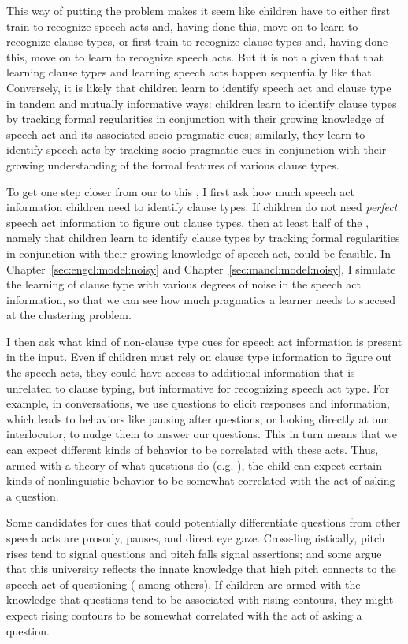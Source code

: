 This way of putting the problem makes it seem like children have to either first train to recognize speech acts and, having done this, move on to learn to recognize clause types, or first train to recognize clause types and, having done this, move on to learn to recognize speech acts. But it is not a given that 
that learning clause types and learning speech acts happen sequentially like that. Conversely, it is likely that children learn to identify speech act and clause type in tandem and mutually informative ways: children learn to identify clause types by tracking formal regularities in conjunction with their growing
knowledge of speech act and its associated socio-pragmatic cues; similarly, they learn
to identify speech acts by tracking socio-pragmatic cues in conjunction with their growing
understanding of the formal features of various clause types.


To get one step closer from our \subhypos{} to this \tbf{\hypos{}}, I first ask how much speech act information children need to identify clause types. If children do not need \emph{perfect} speech act information to figure out clause types, then at least half of the \hypos{}, namely that children learn to identify clause types by tracking formal regularities in conjunction with their growing
knowledge of speech act, could be feasible. 
In Chapter~\ref{sec:engcl:model:noisy} and Chapter~\ref{sec:mancl:model:noisy}, I simulate the learning of clause type with various degrees of noise in the speech act information, so that we can see how much pragmatics a learner needs to succeed at the clustering problem. 

I then %
ask what kind of non-clause type cues for speech act information is present in the input. Even if children must rely on clause type information to figure out the speech acts, they could have access to additional information that is unrelated to clause typing, but informative for recognizing speech act type. For example, in conversations, we use questions to elicit responses and information, which leads to behaviors like pausing after questions, or looking directly at our interlocutor, to nudge them to answer our questions. 
This in turn means that we can expect different kinds of behavior to be correlated with these acts. Thus, armed with a theory of what questions do (e.g. \cite{carruthers2018q}), the child can expect certain kinds of nonlinguistic behavior to be somewhat correlated with the act of asking a question. 

Some candidates for cues that could potentially differentiate questions from other speech acts are prosody, pauses, and direct eye gaze. Cross-linguistically, pitch rises tend to signal questions and pitch falls signal assertions; and some argue that this university reflects the innate knowledge that high pitch connects to the speech act of questioning (\cite{ohala1984,gussenhovenchen2000,gussenhoven2002} among others). If children are armed with the knowledge that questions tend to be associated with rising contours, they might expect rising contours to be somewhat correlated with the act of asking a question. 

